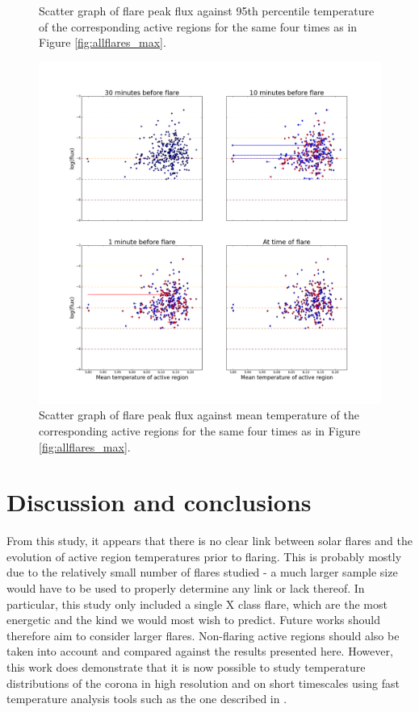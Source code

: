 \documentclass[referee,a4paper,12pt]{swsc}
\begin{document}
\begin{linenumbers}
\begin{figure}
	\caption{Scatter graph of flare peak flux against 95th percentile temperature of the corresponding active regions for the same four times as in Figure \ref{fig:allflares_max}.}
	\label{fig:allflares_p95}
\end{figure}
\begin{figure}
	\centering
		\includegraphics[width=0.9\columnwidth]{tempplotsmean/allflares.png}
	\caption{Scatter graph of flare peak flux against mean temperature of the corresponding active regions for the same four times as in Figure \ref{fig:allflares_max}.}
	\label{fig:allflares_mean}
\end{figure}

\section{Discussion and conclusions}
From this study, it appears that there is no clear link between solar flares and the evolution of active region temperatures prior to flaring.
This is probably mostly due to the relatively small number of flares studied - a much larger sample size would have to be used to properly determine any link or lack thereof.
In particular, this study only included a single X class flare, which are the most energetic and the kind we would most wish to predict.
Future works should therefore aim to consider larger flares.
Non-flaring active regions should also be taken into account and compared against the results presented here.
However, this work does demonstrate that it is now possible to study temperature distributions of the corona in high resolution and on short timescales using fast temperature analysis tools such as the one described in .


\end{linenumbers}
\end{document}
